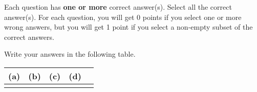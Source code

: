 
Each question has \textbf{one or more} correct answer(s). Select all the correct answer(s). For each question, you will get 0 points if you select one or more wrong answers, but you will get 1 point if you select a non-empty subset of the correct answers.

Write your answers in the following table.


\begin{table}[htbp]
	\centering
	\begin{tabular}{|p{2cm}|p{2cm}|p{2cm}|p{2cm}|p{2cm}|}
		\hline 
		(a) & (b) & (c) & (d)  \\
		\hline
		   &  &  &  \\
		\hline
	\end{tabular} 
\end{table}

